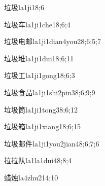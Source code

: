 
\begin{verbete}{垃圾}{la1ji1}{8;6}
\end{verbete}

\begin{verbete}{垃圾车}{la1ji1che1}{8;6;4}
\end{verbete}

\begin{verbete}{垃圾电邮}{la1ji1dian4you2}{8;6;5;7}
\end{verbete}

\begin{verbete}{垃圾堆}{la1ji1dui1}{8;6;11}
\end{verbete}

\begin{verbete}{垃圾工}{la1ji1gong1}{8;6;3}
\end{verbete}

\begin{verbete}{垃圾食品}{la1ji1shi2pin3}{8;6;9;9}
\end{verbete}

\begin{verbete}{垃圾筒}{la1ji1tong3}{8;6;12}
\end{verbete}

\begin{verbete}{垃圾箱}{la1ji1xiang1}{8;6;15}
\end{verbete}

\begin{verbete}{垃圾邮件}{la1ji1you2jian4}{8;6;7;6}
\end{verbete}

\begin{verbete}{拉拉队}{la1la1dui4}{8;8;4}
\end{verbete}

\begin{verbete}{蜡烛}{la4zhu2}{14;10}
\end{verbete}

